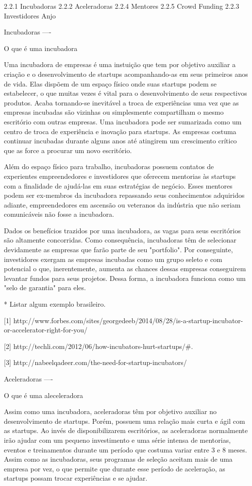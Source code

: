 2.2.1 Incubadoras
2.2.2 Aceleradoras
2.2.4 Mentores
2.2.5 Crowd Funding
2.2.3 Investidores Anjo

Incubadoras
----

O que é uma incubadora

Uma incubadora de empresas é uma instuição que tem por objetivo auxiliar a criação e o desenvolvimento de startups acompanhando-as em seus primeiros anos de vida. Elas dispõem de um espaço físico onde suas startups podem se estabelecer, o que muitas vezes é vital para o desenvolvimento de seus respectivos produtos. Acaba tornando-se inevitável a troca de experiências uma vez que as empresas incubadas são vizinhas ou simplesmente compartilham o mesmo escritório com outras empresas. Uma incubadora pode ser sumarizada como um centro de troca de experiência e inovação para startups. As empresas costuma continuar incubadas durante alguns anos até atingirem um crescimento crítico que as force a procurar um novo escritório.

Além do espaço físico para trabalho, incubadoras possuem contatos de experientes empreendedores e investidores que oferecem mentorias às startups com a finalidade de ajudá-las em suas estratégias de negócio. Esses mentores podem ser ex-membros da incubadora repassando seus conhecimentos adquiridos adiante, empreendedores em ascensão ou veteranos da indústria que não seriam comunicáveis não fosse a incubadora.

Dados os benefícios trazidos por uma incubadora, as vagas para seus escritórios são altamente concorridas. Como consequência, incubadoras têm de selecionar devidamente as empresas que farão parte de seu "portfolio". Por conseguinte, investidores exergam as empresas incubadas como um grupo seleto e com potencial o que, inerentemente, aumenta as chances dessas empresas conseguirem levantar fundos para seus projetos. Dessa forma, a incubadora funciona como um "selo de garantia" para eles.

* Listar algum exemplo brasileiro.

[1]
http://www.forbes.com/sites/georgedeeb/2014/08/28/is-a-startup-incubator-or-accelerator-right-for-you/

[2]
http://techli.com/2012/06/how-incubators-hurt-startups/#.

[3]
http://nabeelqadeer.com/the-need-for-startup-incubators/


Aceleradoras
----

O que é uma aleceleradora

Assim como uma incubadora, aceleradoras têm por objetivo auxiliar no desenvolvimento de startups. Porém, possuem uma relação mais curta e ágil com as startups. Ao invés de disponibilizarem escritórios, as aceleradoras normalmente irão ajudar com um pequeno investimento e uma série intensa de mentorias, eventos e treinamentos durante um período que costuma variar entre 3 e 8 meses. Assim como as incubadoras, seus programas de seleção aceitam mais de uma empresa por vez, o que permite que durante esse período de aceleração, as startups possam trocar experiências e se ajudar.

